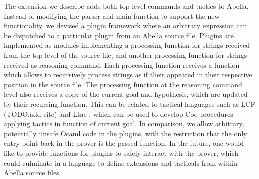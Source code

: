 \documentclass[nocopyrightspace,authoryear]{sigplanconf}
\begin{document}
The extension we describe adds both top level commands and tactics to Abella. Instead of modifying the parser and main function to support the new functionality, we devised a plugin framework where an arbitrary expression can be dispatched to a particular plugin from an Abella source file. Plugins are implemented as modules implementing a processing function for strings received from the top level of the source file, and another processing function for strings received as reasoning command. Each processing function receives a function which allows to recursively process strings as if their appeared in their respective position in the source file. The processing function at the reasoning command level also receives a copy of the current goal and hypothesis, which are updated by their recursing function. This can be related to tactical languages such as LCF (TODO:add cite) and Ltac \cite{ltacpap}, which can be used to develop Coq procedures applying tactics in function of current goal. In comparison, we allow arbitrary, potentially unsafe Ocaml code in the plugins, with the restriction that the only entry point back in the prover is the passed function. In the future, one would like to provide functions for plugins to safely interact with the prover, which could culminate in a language to define extensions and tacticals from within Abella source files. 





\end{document}
